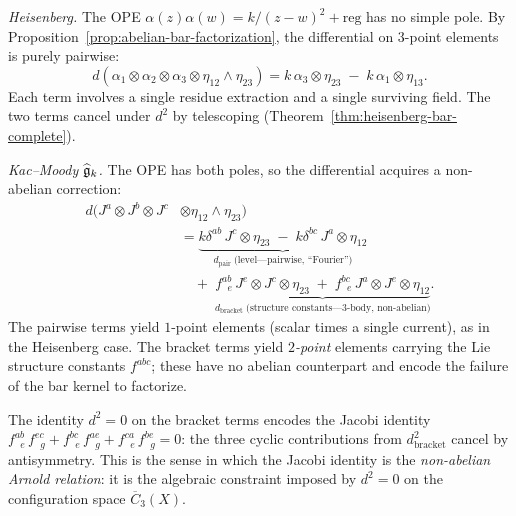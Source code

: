 \begin{example}
\label{ex:heisenberg-vs-km}

\emph{Heisenberg.}
The OPE $\alpha(z)\alpha(w) = k/(z{-}w)^2 + \mathrm{reg}$ has no
simple pole.  By Proposition~\ref{prop:abelian-bar-factorization},
the differential on $3$-point elements is purely pairwise:
\[
d(\alpha_1 \otimes \alpha_2 \otimes \alpha_3
  \otimes \eta_{12} \wedge \eta_{23})
= k\, \alpha_3 \otimes \eta_{23}
  \;-\; k\, \alpha_1 \otimes \eta_{13}.
\]
Each term involves a single residue extraction and a single
surviving field.  The two terms cancel under $d^2$ by telescoping
(Theorem~\ref{thm:heisenberg-bar-complete}).

\emph{Kac--Moody $\widehat{\mathfrak{g}}_k$.}
The OPE has both poles, so the differential acquires a non-abelian
correction:
\begin{align*}
d(J^a \otimes J^b \otimes J^c
  &\otimes \eta_{12} \wedge \eta_{23}) \\
&= \underbrace{k\delta^{ab}\, J^c \otimes \eta_{23}
  \;-\; k\delta^{bc}\, J^a
  \otimes \eta_{12}}_{\displaystyle
  d_{\mathrm{pair}}\;\text{(level---pairwise, ``Fourier'')}} \\
&\quad+\; \underbrace{f^{ab}_{\;\;e}\, J^e \otimes J^c
  \otimes \eta_{23}
  \;+\; f^{bc}_{\;\;e}\, J^a \otimes J^e
  \otimes \eta_{12}}_{\displaystyle
  d_{\mathrm{bracket}}\;\text{(structure
  constants---$3$-body, non-abelian)}}.
\end{align*}
The pairwise terms yield $1$-point elements (scalar times a single
current), as in the Heisenberg case.  The bracket terms yield
\emph{$2$-point} elements carrying the Lie structure constants
$f^{abc}$; these have no abelian counterpart and encode the failure
of the bar kernel to factorize.

The identity $d^2 = 0$ on the bracket terms encodes the Jacobi
identity
$f^{ab}_{\;\;e}\, f^{ec}_{\;\;g}
+ f^{bc}_{\;\;e}\, f^{ae}_{\;\;g}
+ f^{ca}_{\;\;e}\, f^{be}_{\;\;g} = 0$:
the three cyclic contributions from $d_{\mathrm{bracket}}^2$ cancel
by antisymmetry.  This is the sense in which the Jacobi identity is
the \emph{non-abelian Arnold relation}: it is the algebraic
constraint imposed by $d^2 = 0$ on the configuration space
$\overline{C}_3(X)$.
\end{example}

